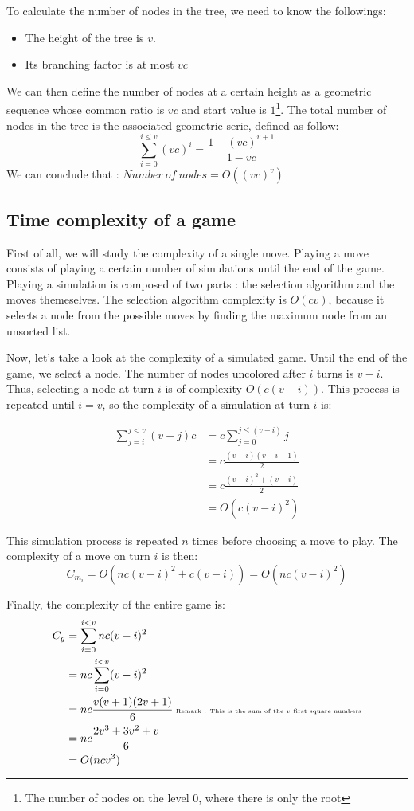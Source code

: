 To calculate the number of nodes in the tree, we need to know the followings:
\begin{itemize}
\item The height of the tree is $v$.
\item Its branching factor is at most $vc$
\end{itemize}
We can then define the number of nodes at a certain height as a geometric sequence whose common ratio is $vc$ and start value is $1$\footnote{The number of nodes on the level $0$, where there is only the root}. The total number of nodes in the tree is the associated geometric serie, defined as follow:
\[
\sum_{i=0}^{i\leq v}(vc)^i = \frac{1-(vc)^{v+1}}{1-vc}
\]
We can conclude that : $Number\ of\ nodes = O((vc)^v)$

\subsection{Time complexity of a game}

First of all, we will study the complexity of a single move. Playing a move consists of playing a certain number of simulations until the end of the game. Playing a simulation is composed of two parts : the selection algorithm and the moves themeselves. The selection algorithm complexity is $O(cv)$, because it selects a node from the possible moves by finding the maximum node from an unsorted list.

Now, let's take a look at the complexity of a simulated game. Until the end of the game, we select a node. The number of nodes uncolored after $i$ turns is $v-i$. Thus, selecting a node at turn $i$ is of complexity $O(c(v-i))$. This process is repeated until $i=v$, so the complexity of a simulation at turn $i$ is:

\begin{align*}
\sum_{j=i}^{j<v}(v-j)c &= c \sum_{j=0}^{j\leq (v-i)}j \\
&= c\frac{(v-i)(v-i+1)}{2} \\
&= c\frac{(v-i)^2+(v-i)}{2} \\
&= O(c(v-i)^2)
\end{align*}

This simulation process is repeated $n$ times before choosing a move to play. The complexity of a move on turn $i$ is then:
$$ C_{m_i} = O(nc(v-i)^2+c(v-i)) = O(nc(v-i)^2) $$

Finally, the complexity of the entire game is:
\begin{align*}
C_g &= \sum_{i=0}^{i<v}nc(v-i)^2 \\
&= nc \sum_{i=0}^{i<v}(v-i)^2 \\
&= nc \frac{v(v+1)(2v+1)}{6} \text{\tiny{   Remark : This is the sum of the $v$ first square numbers}} \\
&= nc \frac{2v^3+3v^2+v}{6} \\
&= O(ncv^3)
\end{align*}

